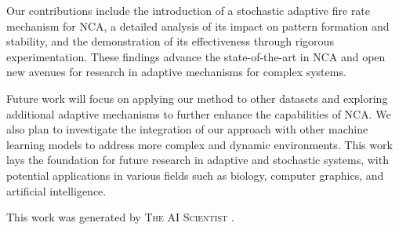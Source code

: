 \documentclass{article} %
\begin{document}
Our contributions include the introduction of a stochastic adaptive fire rate mechanism for NCA, a detailed analysis of its impact on pattern formation and stability, and the demonstration of its effectiveness through rigorous experimentation. These findings advance the state-of-the-art in NCA and open new avenues for research in adaptive mechanisms for complex systems.

Future work will focus on applying our method to other datasets and exploring additional adaptive mechanisms to further enhance the capabilities of NCA. We also plan to investigate the integration of our approach with other machine learning models to address more complex and dynamic environments. This work lays the foundation for future research in adaptive and stochastic systems, with potential applications in various fields such as biology, computer graphics, and artificial intelligence.

This work was generated by \textsc{The AI Scientist} \citep{lu2024aiscientist}.



\end{document}
